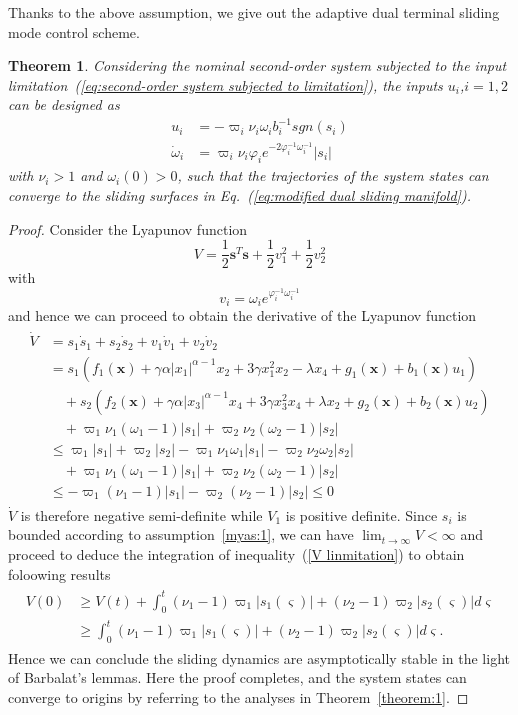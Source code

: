 \documentclass[3p]{elsarticle}
\theoremstyle{plain}
\newtheorem{mythm}{Theorem}
\theoremstyle{remark}
\begin{document}
{Thanks to the above assumption, we give out the adaptive dual terminal sliding mode control scheme.
\begin{mythm}
Considering the nominal second-order system subjected to the input limitation~(\ref{eq:second-order system subjected to limitation}), the inputs $u_i$,$i=1,2$ can be designed as
\begin{align}
  u_i &= -\varpi_i\nu_i\omega_i b_i^{-1}sgn(s_i)\\
  \dot\omega_i&= \varpi_i\nu_i\varphi_i e^{-2\varphi_i^{-1}\omega_i^{-1}}\vert s_i\vert
\end{align}
with $\nu_i>1$ and $\omega_i(0)>0$, such that the trajectories of the system states can converge to the sliding surfaces in Eq.~(\ref{eq:modified dual sliding manifold}).
\end{mythm}
\begin{proof}
Consider the Lyapunov function
$$V=\frac{1}{2}\bm s^T\bm s+\frac{1}{2}v_1^2+\frac{1}{2}v_2^2$$
with
$$v_i = \omega_ie^{\varphi_i^{-1}\omega_i^{-1}}$$
and hence we can proceed to obtain the derivative of the Lyapunov function
\begin{align}\begin{split}
\dot V &=s_1\dot s_1+s_2\dot s_2+v_1\dot v_1+v_2\dot v_2\\
&=s_1(f_1(\bm x)+\gamma\alpha\vert x_1\vert^{\alpha-1}x_2+3\gamma x_1^2x_2-\lambda x_4+g_1(\bm x)+b_1(\bm x)u_1)\\
&\quad +s_2(f_2(\bm x)+\gamma\alpha\vert x_3\vert^{\alpha-1}x_4+3\gamma x_3^2x_4+\lambda x_2+g_2(\bm x)+b_2(\bm x)u_2)\\
&\quad+\varpi_1\nu_1(\omega_1-1)\vert s_1\vert+\varpi_2\nu_2(\omega_2-1)\vert s_2\vert\\
&\le \varpi_1\vert s_1\vert+\varpi_2\vert s_2\vert-\varpi_1\nu_1\omega_1\vert s_1\vert-\varpi_2\nu_2\omega_2\vert s_2\vert\\
&\quad + \varpi_1\nu_1(\omega_1-1)\vert s_1\vert+\varpi_2\nu_2(\omega_2-1)\vert s_2\vert\\
&\le -\varpi_1(\nu_1-1)\vert s_1\vert-\varpi_2(\nu_2-1)\vert s_2\vert\le 0
\end{split}\end{align}\label{V linmitation}
$\dot V$ is therefore negative semi-deﬁnite while $V_1$ is positive deﬁnite. Since  $s_i$ is bounded according to assumption~\ref{myas:1}, we can have $\lim_{t\to\infty}V<\infty$ and proceed to deduce the integration of inequality~(\ref{V linmitation}) to obtain foloowing results
\begin{align}\begin{split}
V(0)&\ge V(t)+\int_0^t(\nu_1-1)\varpi_1\vert s_1(\varsigma)\vert+(\nu_2-1)\varpi_2\vert s_2(\varsigma)\vert d\varsigma\\
&\ge\int_0^t(\nu_1-1)\varpi_1\vert s_1(\varsigma)\vert+(\nu_2-1)\varpi_2\vert s_2(\varsigma)\vert d\varsigma.
\end{split}\end{align}
Hence we can conclude the sliding dynamics are asymptotically stable in the light of Barbalat’s lemmas. Here the proof completes, and the system states can converge to origins by referring to the analyses in Theorem~\ref{theorem:1}.
\end{proof}
}
\end{document}
